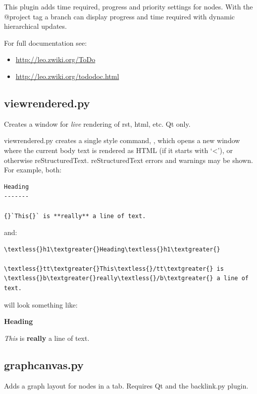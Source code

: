 \documentclass[a4paper,10pt,english]{sphinxmanual}
\begin{document}
This plugin adds time required, progress and priority settings for nodes. With
the @project tag a branch can display progress and time required with dynamic
hierarchical updates.

For full documentation see:
\begin{itemize}
\item {} 
\href{http://leo.zwiki.org/ToDo}{http://leo.zwiki.org/ToDo}

\item {} 
\href{http://leo.zwiki.org/tododoc.html}{http://leo.zwiki.org/tododoc.html}

\end{itemize}


\subsection{viewrendered.py}
\label{plugins:viewrendered-py}
Creates a window for \emph{live} rendering of rst, html, etc.  Qt only.

viewrendered.py creates a single  style command, ,
which opens a new window where the current body text is rendered as HTML
(if it starts with `\textless{}'), or otherwise reStructuredText.  reStructuredText
errors and warnings may be shown.  For example, both:

\begin{Verbatim}[commandchars=\\\{\}]
Heading
-------

{}`This{}` is **really** a line of text.
\end{Verbatim}

and:

\begin{Verbatim}[commandchars=\\\{\}]
\textless{}h1\textgreater{}Heading\textless{}h1\textgreater{}

\textless{}tt\textgreater{}This\textless{}/tt\textgreater{} is \textless{}b\textgreater{}really\textless{}/b\textgreater{} a line of text.
\end{Verbatim}

will look something like:

\textbf{Heading}

\emph{This} is \textbf{really} a line of text.


\subsection{graphcanvas.py}
\label{plugins:graphcanvas-py}
Adds a graph layout for nodes in a tab.
Requires Qt and the backlink.py plugin.
\end{document}
